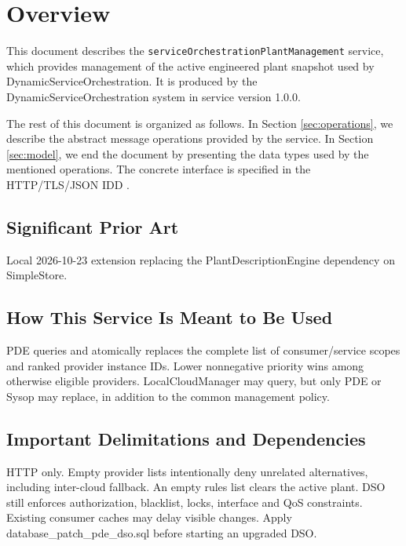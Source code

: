 \documentclass[a4paper]{arrowhead}
\begin{document}
\section{Overview}
\label{sec:overview}

This document describes the \texttt{service\allowbreak{}Orchestration\allowbreak{}Plant\allowbreak{}Management} service, which provides management of the active engineered plant snapshot used by Dynamic\allowbreak{}Service\allowbreak{}Orchestration.
It is produced by the DynamicServiceOrchestration system \cite{dso-sysd} in service version 1.0.0.

The rest of this document is organized as follows.
In Section \ref{sec:operations}, we describe the abstract message operations provided by the service.
In Section \ref{sec:model}, we end the document by presenting the data types used by the mentioned operations.
The concrete interface is specified in the HTTP/TLS/JSON IDD \cite{dso-serviceOrchestrationPlantManagement-http-idd}.

\subsection{Significant Prior Art}

Local 2026-10-23 extension replacing the Plant\allowbreak{}Description\allowbreak{}Engine dependency on SimpleStore.

\subsection{How This Service Is Meant to Be Used}

PDE queries and atomically replaces the complete list of consumer/service scopes and ranked provider instance IDs. Lower nonnegative priority wins among otherwise eligible providers. LocalCloudManager may query, but only PDE or Sysop may replace, in addition to the common management policy.

\subsection{Important Delimitations and Dependencies}
\label{sec:delimitations}

HTTP only. Empty provider lists intentionally deny unrelated alternatives, including inter-cloud fallback. An empty rules list clears the active plant. DSO still enforces authorization, blacklist, locks, interface and QoS constraints. Existing consumer caches may delay visible changes. Apply database\_patch\_pde\_dso.sql before starting an upgraded DSO.
\end{document}

